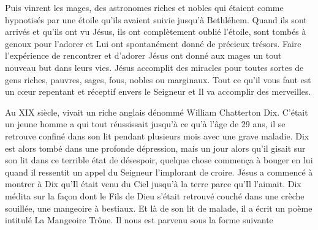 Puis vinrent les mages, des astronomes riches et nobles qui étaient comme hypnotisés par une étoile qu'ils avaient suivie jusqu'à Bethléhem. Quand ils sont arrivés et qu'ils ont vu Jésus, ils ont complètement oublié l'étoile, sont tombés à genoux pour l'adorer et Lui ont spontanément donné de précieux trésors. Faire l'expérience de rencontrer et d'adorer Jésus ont donné aux mages un tout nouveau but dans leurs vies. Jésus accomplit des miracles pour toutes sortes de gens\frcolon{} riches, pauvres, sages, fous, nobles ou marginaux. Tout ce qu'il vous faut est un cœur repentant et réceptif envers le Seigneur et Il va accomplir des merveilles.

Au XIX siècle, vivait un riche anglais dénommé William Chatterton Dix. C'était un jeune homme a qui tout réussissait jusqu'à ce qu'à l'âge de 29 ans, il se retrouve confiné dans son lit pendant plusieurs mois avec une grave maladie. Dix est alors tombé dans une profonde dépression, mais un jour alors qu'il gisait sur son lit dans ce terrible état de désespoir, quelque chose commença à bouger en lui quand il ressentit un appel du Seigneur l'implorant de croire. Jésus a commencé à montrer à Dix qu'Il était venu du Ciel jusqu'à la terre parce qu'Il l'aimait. Dix médita sur la façon dont le Fils de Dieu s'était retrouvé couché dans une crèche souillée, une mangeoire à bestiaux. Et là de son lit de malade, il a écrit un poème intitulé La Mangeoire Trône. Il nous est parvenu sous la forme suivante\frcolon{}

